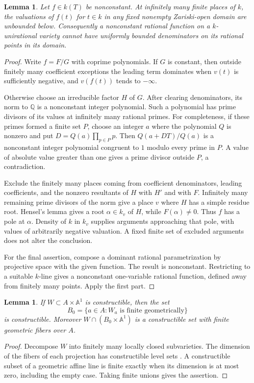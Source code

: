 \documentclass[11pt,a4paper]{article}
\newtheorem{lemma}[theorem]{Lemma}
\theoremstyle{definition}
\newcommand{\Q}{\mathbb Q}\newcommand{\Z}{\mathbb Z}
\newcommand{\A}{\mathbb A}\newcommand{\PP}{\mathbb P}
\begin{document}
\begin{lemma}\label{lem:rational-unbounded}
Let $f\in k(T)$ be nonconstant. At infinitely many finite places
of $k$, the valuations of $f(t)$ for $t\in k$ in any fixed
nonempty Zariski-open domain are unbounded below.
Consequently a nonconstant rational function on a $k$-unirational
variety cannot have uniformly bounded denominators on its rational
points in its domain.
\end{lemma}
\begin{proof}
Write $f=F/G$ with coprime polynomials. If $G$ is constant, then
outside finitely many coefficient exceptions the leading term
dominates when $v(t)$ is sufficiently negative, and $v(f(t))$
tends to $-\infty$.

Otherwise choose an irreducible factor $H$ of $G$. After clearing
denominators, its norm to $\Q$ is a nonconstant integer polynomial.
Such a polynomial has prime divisors of its values at infinitely
many rational primes. For completeness, if these primes formed
a finite set $P$, choose an integer $a$ where the polynomial
$Q$ is nonzero and put $D=Q(a)\prod_{p\in P}p$. Then
$Q(a+DT)/Q(a)$ is a nonconstant integer polynomial congruent to
$1$ modulo every prime in $P$. A value of absolute value greater
than one gives a prime divisor outside $P$, a contradiction.

Exclude the finitely many places coming from coefficient
denominators, leading coefficients, and the nonzero resultants
of $H$ with $H'$ and with $F$. Infinitely many remaining prime
divisors of the norm give a place $v$ where $H$ has a simple
residue root. Hensel's lemma gives a root $\alpha\in k_v$ of
$H$, while $F(\alpha)\ne0$. Thus $f$ has a pole at $\alpha$.
Density of $k$ in $k_v$ supplies arguments approaching that pole,
with values of arbitrarily negative valuation. A fixed finite
set of excluded arguments does not alter the conclusion.

For the final assertion, compose a dominant rational
parametrization by projective space with the given function.
The result is nonconstant. Restricting to a suitable $k$-line
gives a nonconstant one-variable rational function, defined away
from finitely many points. Apply the first part.
\end{proof}

\begin{lemma}\label{lem:finite-locus}
If $W\subset A\times\A^1$ is constructible, then the set
\[
             B_0=\{a\in A:W_a\text{ is finite geometrically}\}
\]
is constructible. Moreover $W\cap(B_0\times\A^1)$ is a
constructible set with finite geometric fibers over $A$.
\end{lemma}
\begin{proof}
Decompose $W$ into finitely many locally closed subvarieties.
The dimension of the fibers of each projection has constructible
level sets \cite[Tag 05F9]{Stacks}. A constructible subset of a
geometric affine line is finite exactly when its dimension is at
most zero, including the empty case. Taking finite unions gives
the assertion.
\end{proof}
\end{document}
